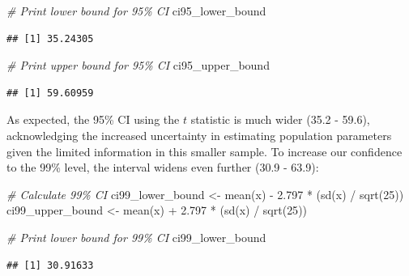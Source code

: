 \documentclass[
]{book}
\newenvironment{Shaded}{\begin{snugshade}}{\end{snugshade}}
\newcommand{\CommentTok}[1]{\textcolor[rgb]{0.56,0.35,0.01}{\textit{#1}}}
\newcommand{\DecValTok}[1]{\textcolor[rgb]{0.00,0.00,0.81}{#1}}
\newcommand{\FloatTok}[1]{\textcolor[rgb]{0.00,0.00,0.81}{#1}}
\newcommand{\FunctionTok}[1]{\textcolor[rgb]{0.00,0.00,0.00}{#1}}
\newcommand{\NormalTok}[1]{#1}
\newcommand{\OtherTok}[1]{\textcolor[rgb]{0.56,0.35,0.01}{#1}}
\newcommand{\SpecialCharTok}[1]{\textcolor[rgb]{0.00,0.00,0.00}{#1}}
\begin{document}
\begin{Shaded}
\begin{Highlighting}[]
\CommentTok{\# Print lower bound for 95\% CI}
\NormalTok{ci95\_lower\_bound}
\end{Highlighting}
\end{Shaded}

\begin{verbatim}
## [1] 35.24305
\end{verbatim}

\begin{Shaded}
\begin{Highlighting}[]
\CommentTok{\# Print upper bound for 95\% CI}
\NormalTok{ci95\_upper\_bound}
\end{Highlighting}
\end{Shaded}

\begin{verbatim}
## [1] 59.60959
\end{verbatim}

As expected, the 95\% CI using the \(t\) statistic is much wider (35.2 - 59.6), acknowledging the increased uncertainty in estimating population parameters given the limited information in this smaller sample. To increase our confidence to the 99\% level, the interval widens even further (30.9 - 63.9):

\begin{Shaded}
\begin{Highlighting}[]
\CommentTok{\# Calculate 99\% CI}
\NormalTok{ci99\_lower\_bound }\OtherTok{\textless{}{-}} \FunctionTok{mean}\NormalTok{(x) }\SpecialCharTok{{-}} \FloatTok{2.797} \SpecialCharTok{*}\NormalTok{ (}\FunctionTok{sd}\NormalTok{(x) }\SpecialCharTok{/} \FunctionTok{sqrt}\NormalTok{(}\DecValTok{25}\NormalTok{))}
\NormalTok{ci99\_upper\_bound }\OtherTok{\textless{}{-}} \FunctionTok{mean}\NormalTok{(x) }\SpecialCharTok{+} \FloatTok{2.797} \SpecialCharTok{*}\NormalTok{ (}\FunctionTok{sd}\NormalTok{(x) }\SpecialCharTok{/} \FunctionTok{sqrt}\NormalTok{(}\DecValTok{25}\NormalTok{))}
\end{Highlighting}
\end{Shaded}

\begin{Shaded}
\begin{Highlighting}[]
\CommentTok{\# Print lower bound for 99\% CI}
\NormalTok{ci99\_lower\_bound}
\end{Highlighting}
\end{Shaded}

\begin{verbatim}
## [1] 30.91633
\end{verbatim}
\end{document}
